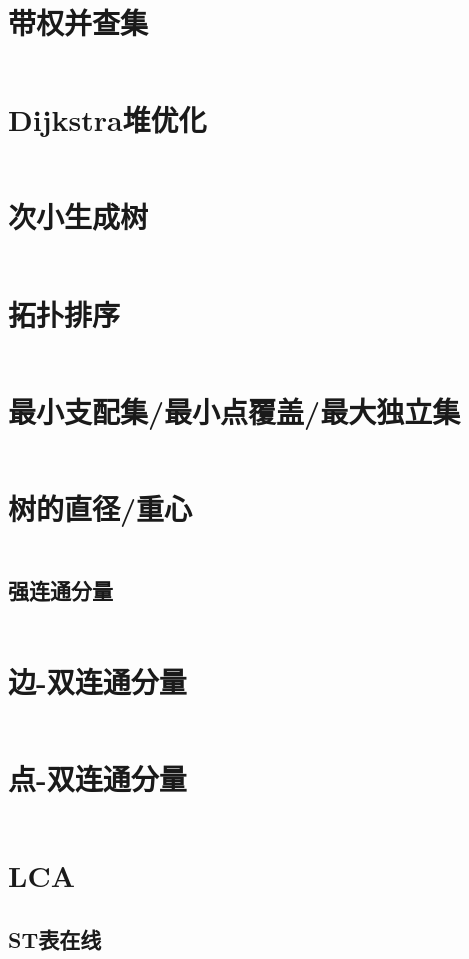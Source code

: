 \documentclass[a4paper,11pt]{article}
\begin{document}
\section*{带权并查集}
\inputminted[]{c++}{Template/TreeGraph/UnionSetII.cpp}
\section*{Dijkstra堆优化}
\inputminted[]{c++}{Template/TreeGraph/Dijkstra.cpp}
\section*{次小生成树}
\inputminted[]{c++}{Template/TreeGraph/SST.cpp}
\section*{拓扑排序}
\inputminted[]{c++}{Template/TreeGraph/TopoSort.cpp}
\section*{最小支配集/最小点覆盖/最大独立集}
\inputminted[]{c++}{Template/TreeGraph/SetPro.cpp}
\section*{树的直径/重心}
\inputminted[]{c++}{Template/TreeGraph/TreeDiameter.cpp}
\subsection*{强连通分量}
\inputminted[]{c++}{Template/TreeGraph/Tarjan-SCC.cpp}
\section*{边-双连通分量}
\inputminted[]{c++}{Template/TreeGraph/Tarjan-Edge-BCC.cpp}
\section*{点-双连通分量}
\inputminted[]{c++}{Template/TreeGraph/Tarjan-Vertex-BCC.cpp}
\section*{LCA}
\subsection*{ST表在线}
\inputminted[]{c++}{Template/TreeGraph/LCA-ST.cpp}
\end{document}
